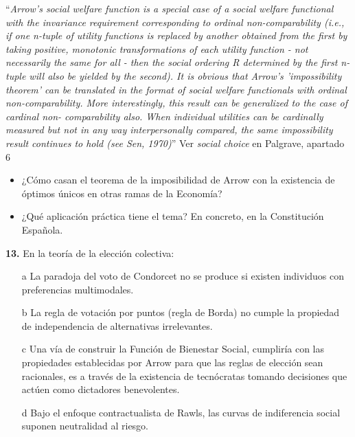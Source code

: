 \documentclass{nuevotema}
\begin{document}

``\textit{Arrow's social welfare function is a special case of a
	social welfare functional with the invariance requirement
	corresponding to ordinal non-comparability (i.e., if
	one n-tuple of utility functions is replaced by another
	obtained from the first by taking positive, monotonic
	transformations of each utility function - not necessarily
	the same for all - then the social ordering R determined
	by the first n-tuple will also be yielded by the second). It
	is obvious that Arrow's 'impossibility theorem' can be
	translated in the format of social welfare functionals
	with ordinal non-comparability. More interestingly, this
	result can be generalized to the case of cardinal non-
	comparability also. When individual utilities can be
	cardinally measured but not in any way interpersonally
	compared, the same impossibility result continues to
	hold (see Sen, 1970)}'' Ver \textit{social choice} en Palgrave, apartado 6

\preguntas
{}
\begin{itemize}
    \item ¿Cómo casan el teorema de la imposibilidad de Arrow con la existencia de óptimos únicos en otras ramas de la Economía?
    \item ¿Qué aplicación práctica tiene el tema? En concreto, en la Constitución Española.
\end{itemize}


\textbf{13.} En la teoría de la elección colectiva:

\begin{itemize}
	\item[a] La paradoja del voto de Condorcet no se produce si existen individuos con preferencias multimodales.
	\item[b] La regla de votación por puntos (regla de Borda) no cumple la propiedad de independencia de alternativas irrelevantes.
	\item[c] Una vía de construir la Función de Bienestar Social, cumpliría con las propiedades establecidas por Arrow para que las reglas de elección sean racionales, es a través de la existencia de tecnócratas tomando decisiones que actúen como dictadores benevolentes.
	\item[d] Bajo el enfoque contractualista de Rawls, las curvas de indiferencia social suponen neutralidad al riesgo.
\end{itemize}
\end{document}
